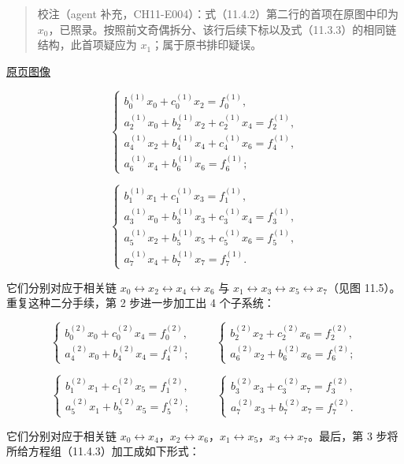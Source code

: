 \documentclass[
  10pt,
  fontset=fandol]{ctexart}
\begin{document}
\begin{quote}
校注（agent 补充，CH11-E004）：式（11.4.2）第二行的首项在原图中印为 \(x_0\)，已照录。按照前文奇偶拆分、该行后续下标以及式（11.3.3）的相同链结构，此首项疑应为 \(x_1\)；属于原书排印疑误。
\end{quote}

\href{../../source-images/pdf-290.jpeg}{原页图像}

\[
\begin{cases}
b_0^{(1)}x_0+c_0^{(1)}x_2=f_0^{(1)},\\
a_2^{(1)}x_0+b_2^{(1)}x_2+c_2^{(1)}x_4=f_2^{(1)},\\
a_4^{(1)}x_2+b_4^{(1)}x_4+c_4^{(1)}x_6=f_4^{(1)},\\
a_6^{(1)}x_4+b_6^{(1)}x_6=f_6^{(1)};
\end{cases}
\]

\[
\begin{cases}
b_1^{(1)}x_1+c_1^{(1)}x_3=f_1^{(1)},\\
a_3^{(1)}x_0+b_3^{(1)}x_3+c_3^{(1)}x_4=f_3^{(1)},\\
a_5^{(1)}x_2+b_5^{(1)}x_5+c_5^{(1)}x_6=f_5^{(1)},\\
a_7^{(1)}x_4+b_7^{(1)}x_7=f_7^{(1)}.
\end{cases}
\]

它们分别对应于相关链 \(x_0\leftrightarrow x_2\leftrightarrow x_4\leftrightarrow x_6\) 与 \(x_1\leftrightarrow x_3\leftrightarrow x_5\leftrightarrow x_7\)（见图 11.5）。重复这种二分手续，第 2 步进一步加工出 4 个子系统：

\[
\begin{cases}
b_0^{(2)}x_0+c_0^{(2)}x_4=f_0^{(2)},\\
a_4^{(2)}x_0+b_4^{(2)}x_4=f_4^{(2)};
\end{cases}
\qquad
\begin{cases}
b_2^{(2)}x_2+c_2^{(2)}x_6=f_2^{(2)},\\
a_6^{(2)}x_2+b_6^{(2)}x_6=f_6^{(2)};
\end{cases}
\]

\[
\begin{cases}
b_1^{(2)}x_1+c_1^{(2)}x_5=f_1^{(2)},\\
a_5^{(2)}x_1+b_5^{(2)}x_5=f_5^{(2)};
\end{cases}
\qquad
\begin{cases}
b_3^{(2)}x_3+c_3^{(2)}x_7=f_3^{(2)},\\
a_7^{(2)}x_3+b_7^{(2)}x_7=f_7^{(2)}.
\end{cases}
\]

它们分别对应于相关链 \(x_0\leftrightarrow x_4\)，\(x_2\leftrightarrow x_6\)，\(x_1\leftrightarrow x_5\)，\(x_3\leftrightarrow x_7\)。最后，第 3 步将所给方程组（11.4.3）加工成如下形式：
\end{document}
